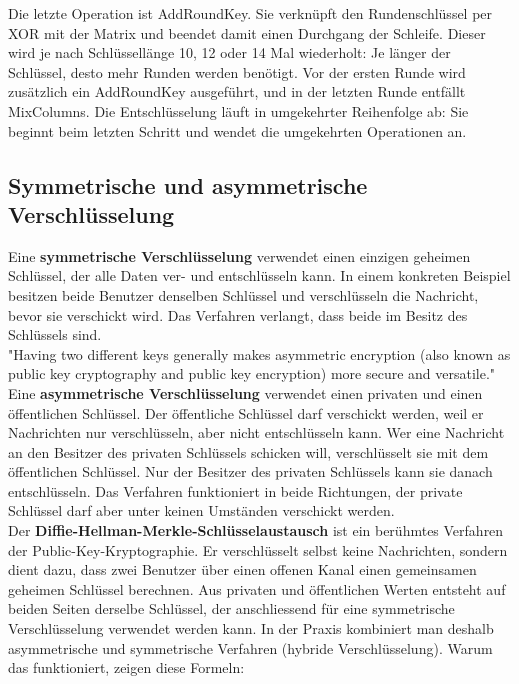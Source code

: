 Die letzte Operation ist AddRoundKey. Sie verknüpft den Rundenschlüssel per XOR mit der Matrix und beendet damit einen Durchgang der Schleife. Dieser wird je nach Schlüssellänge 10, 12 oder 14 Mal wiederholt: Je länger der Schlüssel, desto mehr Runden werden benötigt.
Vor der ersten Runde wird zusätzlich ein AddRoundKey ausgeführt, und in der letzten Runde entfällt MixColumns. Die Entschlüsselung läuft in umgekehrter Reihenfolge ab: Sie beginnt beim letzten Schritt und wendet die umgekehrten Operationen an.

\subsection{Symmetrische und asymmetrische Verschlüsselung}

Eine \textbf{symmetrische Verschlüsselung} verwendet einen einzigen geheimen Schlüssel, der alle Daten ver- und entschlüsseln kann. In einem konkreten Beispiel besitzen beide Benutzer denselben Schlüssel und verschlüsseln die Nachricht, bevor sie verschickt wird. Das Verfahren verlangt, dass beide im Besitz des Schlüssels sind.\\

"Having two different keys generally makes asymmetric encryption (also known as public key cryptography and public key encryption) more secure and versatile."\citep{kosinskiWhatSymmetricEncryption2024}\\

Eine \textbf{asymmetrische Verschlüsselung} verwendet einen privaten und einen öffentlichen Schlüssel. Der öffentliche Schlüssel darf verschickt werden, weil er Nachrichten nur verschlüsseln, aber nicht entschlüsseln kann. Wer eine Nachricht an den Besitzer des privaten Schlüssels schicken will, verschlüsselt sie mit dem öffentlichen Schlüssel. Nur der Besitzer des privaten Schlüssels kann sie danach entschlüsseln. Das Verfahren funktioniert in beide Richtungen, der private Schlüssel darf aber unter keinen Umständen verschickt werden.\\

Der \textbf{Diffie-Hellman-Merkle-Schlüsselaustausch} ist ein berühmtes Verfahren der Public-Key-Kryptographie.\citep{DiffieHellmanMerkleSchlusselaustausch} Er verschlüsselt selbst keine Nachrichten, sondern dient dazu, dass zwei Benutzer über einen offenen Kanal einen gemeinsamen geheimen Schlüssel berechnen. Aus privaten und öffentlichen Werten entsteht auf beiden Seiten derselbe Schlüssel, der anschliessend für eine symmetrische Verschlüsselung verwendet werden kann. In der Praxis kombiniert man deshalb asymmetrische und symmetrische Verfahren (hybride Verschlüsselung). Warum das funktioniert, zeigen diese Formeln:

